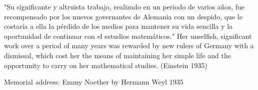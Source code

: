 "Su significante y altruista trabajo, realizado en un periodo de varios años, fue recompensado por los nuevos governantes de Alemania con un despido, que le costaría a ella la pérdido de los medios para mantener su vida sencilla y la oportunidad de continuar con el estudios matemáticos."
Her unselﬁsh, signiﬁcant work over a period of many years was rewarded by new rulers of Germany with a dismissal, which cost her the means of maintaining her simple life and the opportunity to carry on her mathematical studies.
(Einstein 1935)





Memorial address: Emmy Noether by Hermann Weyl 1935